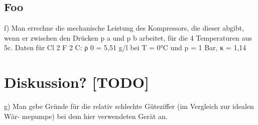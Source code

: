 \subsection{Foo}
f) Man errechne die mechanische Leistung des Kompressors, die dieser abgibt, wenn
er zwischen den Drücken p a und p b arbeitet, für die 4 Temperaturen aus 5c. Daten
für Cl 2 F 2 C: ρ 0 = 5,51 g/l bei T = 0°C und p = 1 Bar, κ = 1,14

\section{Diskussion? [TODO]}

g) Man gebe Gründe für die relativ schlechte Güteziffer (im Vergleich zur idealen Wär-
mepumpe) bei dem hier verwendeten Gerät an.



